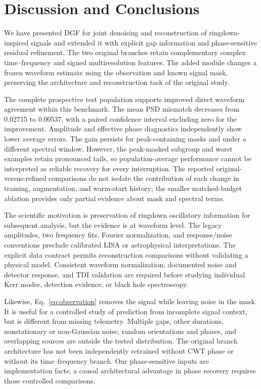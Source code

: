 \documentclass[10pt,prd,aps,a4paper,twocolumn,superscriptaddress,nofootinbib,floatfix]{revtex4-2}
\begin{document}
\section{Discussion and Conclusions}\label{sec:discussion}
We have presented DGF for joint denoising and reconstruction of ringdown-inspired signals and extended it with explicit gap information and phase-sensitive residual refinement. The two original branches retain complementary complex time--frequency and signed multiresolution features. The added module changes a frozen waveform estimate using the observation and known signal mask, preserving the architecture and reconstruction task of the original study.

The complete prospective test population supports improved direct waveform agreement within this benchmark. The mean PSD mismatch decreases from 0.02715 to 0.00537, with a paired confidence interval excluding zero for the improvement. Amplitude and effective phase diagnostics independently show lower average errors. The gain persists for peak-containing masks and under a different spectral window. However, the peak-masked subgroup and worst examples retain pronounced tails, so population-average performance cannot be interpreted as reliable recovery for every interruption. The reported original-versus-refined comparisons do not isolate the contribution of each change in training, augmentation, and warm-start history; the smaller matched-budget ablation provides only partial evidence about mask and spectral terms.

The scientific motivation is preservation of ringdown oscillatory information for subsequent analysis, but the evidence is at waveform level. The legacy amplitudes, two frequency fits, Fourier normalization, and response/noise conventions preclude calibrated LISA or astrophysical interpretations. The explicit data contract permits reconstruction comparisons without validating a physical model. Consistent waveform normalization, documented noise and detector response, and TDI validation are required before studying individual Kerr modes, detection evidence, or black hole spectroscopy.

Likewise, Eq.~\eqref{eq:observation} removes the signal while leaving noise in the mask. It is useful for a controlled study of prediction from incomplete signal context, but is different from missing telemetry. Multiple gaps, other durations, nonstationary or non-Gaussian noise, random orientations and phases, and overlapping sources are outside the tested distribution. The original branch architecture has not been independently retrained without CWT phase or without its time--frequency branch. Our phase-sensitive inputs are implementation facts; a causal architectural advantage in phase recovery requires those controlled comparisons.
\end{document}
